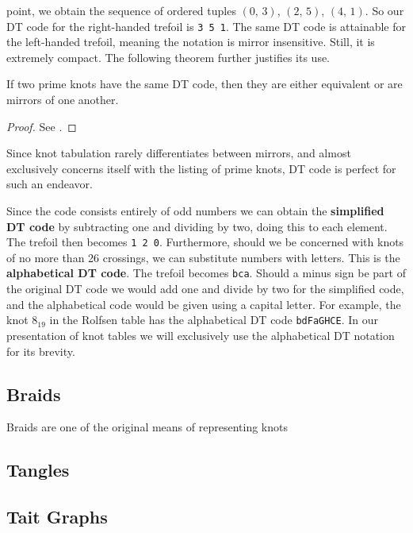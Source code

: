        point, we obtain the sequence of ordered tuples
        $(0,\,3)$, $(2,\,5)$, $(4,\,1)$. So our DT code for the right-handed
        trefoil is \texttt{3 5 1}. The same DT code is attainable for the
        left-handed trefoil, meaning the notation is mirror insensitive. Still,
        it is extremely compact. The following theorem further justifies its
        use.
        \begin{theorem}
            If two prime knots have the same DT code, then they are either
            equivalent or are mirrors of one another.
        \end{theorem}
        \begin{proof}
            See \cite{DOWKER198319}.
        \end{proof}
        Since knot tabulation rarely differentiates between mirrors, and
        almost exclusively concerns itself with the listing of prime knots,
        DT code is perfect for such an endeavor.
        \par\hfill\par
        Since the code consists entirely of odd numbers we can obtain the
        \textbf{simplified DT code} by subtracting one and dividing by two,
        doing this to each element. The trefoil then becomes
        \texttt{1 2 0}. Furthermore, should we be concerned with knots of
        no more than 26 crossings, we can substitute numbers with letters.
        This is the \textbf{alphabetical DT code}. The trefoil becomes
        \texttt{bca}. Should a minus sign be part of the original DT code
        we would add one and divide by two for the simplified code, and the
        alphabetical code would be given using a capital letter. For example,
        the knot $8_{19}$ in the Rolfsen table
        has the alphabetical DT code
        \texttt{bdFaGHCE}. In our presentation of knot tables we will
        exclusively use the alphabetical DT notation for its brevity.
    \subsection{Braids}
        Braids are one of the original means of representing knots
    \subsection{Tangles}
    \subsection{Tait Graphs}
